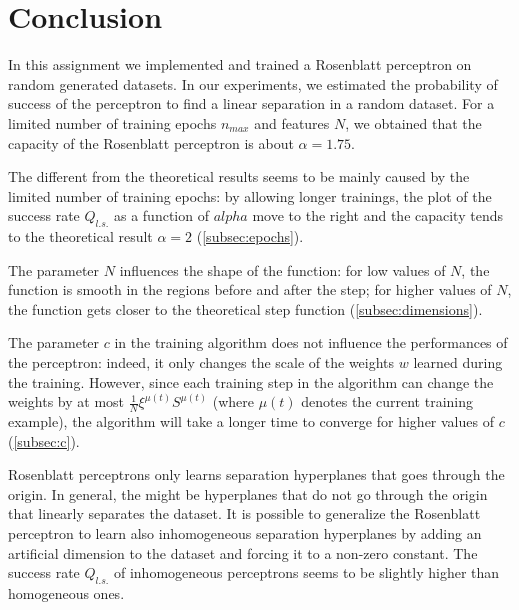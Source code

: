 \section{Conclusion}

In this assignment we implemented and trained a Rosenblatt perceptron on random generated datasets.
In our experiments, we estimated the probability of success of the perceptron to find a linear separation in a random dataset.
For a limited number of training epochs $n_{max}$ and features $N$, we obtained that the capacity of the Rosenblatt perceptron is about $\alpha = 1.75$.

The different from the theoretical results seems to be mainly caused by the limited number of training epochs:
by allowing longer trainings, the plot of the success rate $Q_{l.s.}$ as a function of $alpha$ move to the right and the capacity tends to the theoretical result $\alpha = 2$ (\cref{subsec:epochs}).

The parameter $N$ influences the shape of the function:
for low values of $N$, the function is smooth in the regions before and after the step;
for higher values of $N$, the function gets closer to the theoretical step function (\cref{subsec:dimensions}).

The parameter $c$ in the training algorithm does not influence the performances of the perceptron:
indeed, it only changes the scale of the weights $w$ learned during the training.
However, since each training step in the algorithm can change the weights by at most $\frac{1}{N}\xi^{\mu(t)} S^{\mu(t)}$ (where $\mu(t)$ denotes the current training example), the algorithm will take a longer time to converge for higher values of $c$ (\cref{subsec:c}).

Rosenblatt perceptrons only learns separation hyperplanes that goes through the origin.
In general, the might be hyperplanes that do not go through the origin that linearly separates the dataset.
It is possible to generalize the Rosenblatt perceptron to learn also inhomogeneous separation hyperplanes by adding an artificial dimension to the dataset and forcing it to a non-zero constant.
The success rate $Q_{l.s.}$ of inhomogeneous perceptrons seems to be slightly higher than homogeneous ones.
